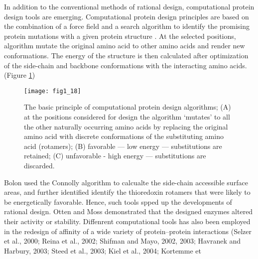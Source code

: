 \begin{refsection}
In addition to the conventional methods of rational design, computational
protein design tools are emerging. Computational protein design principles
are based on the combination of a force field and a search algorithm to
identify the promising protein mutations with a given protein structure
\cite{VanDerSloot2009a}. At the selected positions, algorithm mutate the
original amino acid to other amino acids and render new conformations. The
energy of the structure is then calculated after optimization of the side-chain
and backbone conformations with the interacting amino
acids\cite{VanDerSloot2009a}. (Figure \ref{fig:cpd})
\begin{figure}[h!] \centering \texttt{[image: fig1\_18]}
    \caption[The basic principle of computational protein design algorithms;
        (A) at the positions considered for design the algorithm ‘mutates’ to
        all the other naturally occurring amino acids by replacing the original
        amino acid with discrete conformations of the substituting amino acid
        (rotamers); (B) favorable — low energy — substitutions are retained;
        (C) unfavorable - high energy — substitutions are discarded.]{The basic
            principle of computational protein design algorithms; (A) at the
            positions considered for design the algorithm ‘mutates’ to all the
            other naturally occurring amino acids by replacing the original
            amino acid with discrete conformations of the substituting amino
            acid (rotamers); (B) favorable — low energy — substitutions are
            retained; (C) unfavorable - high energy — substitutions are
            discarded\cite{VanDerSloot2009a}.} 
    \label{fig:cpd} 
\end{figure}
Bolon  used the Connolly
algorithm\cite{Connolly1983} to calcualte the side-chain accessible surface
areas, and further identified identify the thioredoxin rotamers that were
likely to be energetically favorable\cite{Bolon2003}. Hence, such tools spped
up the developments of rational design. Otten  and Moss  demonstrated that the designed enzymes altered their activity or
stability\cite{Otten2010,Moss2009}. Diffenrent computational tools has also
been employed in the redesign of affinity of a wide variety of protein–protein
interactions
(Selzer et al., 2000; Reina et al., 2002; Shifman and Mayo, 2002, 2003;
Havranek and Harbury, 2003; Steed et al., 2003; Kiel et al., 2004; Kortemme et

\end{refsection}
